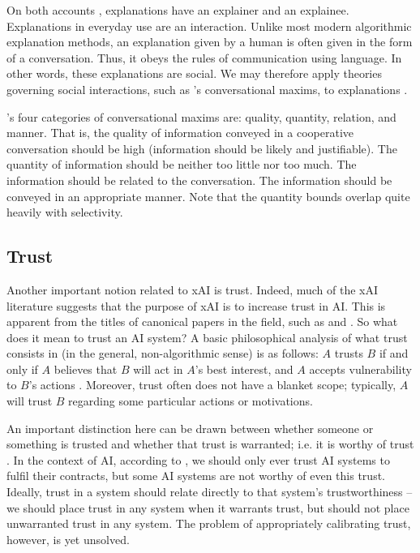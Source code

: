 On both accounts , explanations have an explainer and an explainee. Explanations in everyday use are an interaction. Unlike most modern algorithmic explanation methods, an explanation given by a human is often given in the form of a conversation. Thus, it obeys the rules of communication using language. In other words, these explanations are social. We may therefore apply theories governing social interactions, such as \textcite{Grice_1975}'s conversational maxims, to explanations \cite{miller_explanation_2017}.

\textcite{Grice_1975}'s four categories of conversational maxims are: quality, quantity, relation, and manner. That is, the quality of information conveyed in a cooperative conversation should be high (information should be likely and justifiable). The quantity of information should be neither too little nor too much. The information should be related to the conversation. The information should be conveyed in an appropriate manner. Note that the quantity bounds overlap quite heavily with selectivity.

\subsection{Trust}
Another important notion related to xAI is trust. Indeed, much of the xAI literature suggests that the purpose of xAI is to increase trust in AI. This is apparent from the titles of canonical papers in the field, such as \textcite{ribeiro_why_2016} and \textcite{pieters_explanation_2011}. So what does it mean to trust an AI system? A basic philosophical analysis of what trust consists in (in the general, non-algorithmic sense) is as follows: $A$ trusts $B$ if and only if $A$ believes that $B$ will act in $A$'s best interest, and $A$ accepts vulnerability to $B$'s actions \cite{jacovi_formalizing_2021}. Moreover, trust often does not have a blanket scope; typically, $A$ will trust $B$ regarding some particular actions or motivations.

An important distinction here can be drawn between whether someone or something is trusted and whether that trust is warranted; i.e. it is worthy of trust \cite{hardin_trust_2002}. In the context of AI, according to \textcite{jacovi_formalizing_2021}, we should only ever trust AI systems to fulfil their contracts, but some AI systems are not worthy of even this trust. Ideally, trust in a system should relate directly to that system's trustworthiness – we should place trust in any system when it warrants trust, but should not place unwarranted trust in any system. The problem of appropriately calibrating trust, however, is yet unsolved.

